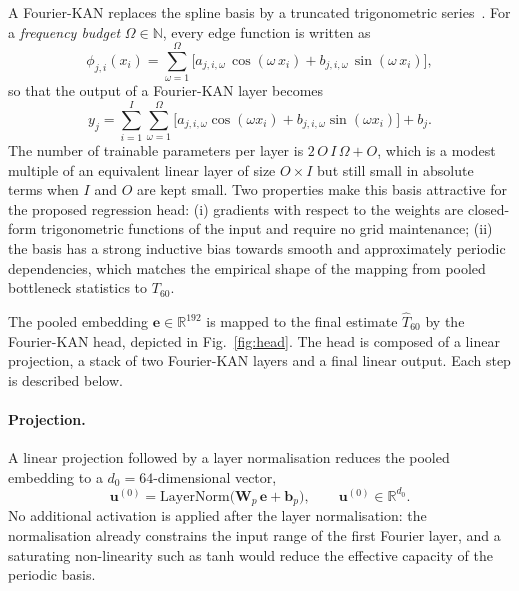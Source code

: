 \documentclass[a4paper,fleqn]{cas-dc}
\begin{document}
A Fourier-KAN replaces the spline basis by a truncated trigonometric
series~\citep{xu2025fourierkan, yang2025kanforspeech}. For a
\emph{frequency budget} $\Omega\in\mathbb{N}$, every edge function is
written as
\begin{equation}\label{eq:fourier_phi}
  \phi_{j,i}(x_i) = \sum_{\omega=1}^{\Omega}
    \bigl[a_{j,i,\omega}\,\cos(\omega\,x_i)
        + b_{j,i,\omega}\,\sin(\omega\,x_i)\bigr],
\end{equation}
so that the output of a Fourier-KAN layer becomes
\begin{equation}\label{eq:fourier_layer}
  y_j = \sum_{i=1}^{I}\sum_{\omega=1}^{\Omega}
        \bigl[a_{j,i,\omega}\cos(\omega x_i)
            + b_{j,i,\omega}\sin(\omega x_i)\bigr] + b_j.
\end{equation}
The number of trainable parameters per layer is $2\,O\,I\,\Omega + O$,
which is a modest multiple of an equivalent linear layer of size
$O\times I$ but still small in absolute terms when $I$ and $O$ are kept
small. Two properties make this basis attractive for the proposed
regression head: (i) gradients with respect to the weights are
closed-form trigonometric functions of the input and require no grid
maintenance; (ii) the basis has a strong inductive bias towards smooth
and approximately periodic dependencies, which matches the empirical
shape of the mapping from pooled bottleneck statistics to $T_{60}$.

The pooled embedding $\mathbf{e}\in\mathbb{R}^{192}$ is mapped to the
final estimate $\hat{T}_{60}$ by the Fourier-KAN head, depicted
in Fig.~\ref{fig:head}. The head is composed of a linear
projection, a stack of two Fourier-KAN layers and a final linear output.
Each step is described below.

\paragraph{Projection.} A linear projection followed by a layer
normalisation reduces the pooled embedding to a $d_{0}=64$-dimensional
vector,
\begin{equation}\label{eq:proj}
  \mathbf{u}^{(0)} = \mathrm{LayerNorm}\bigl(\mathbf{W}_{p}\,\mathbf{e}+
                                              \mathbf{b}_{p}\bigr),
  \qquad \mathbf{u}^{(0)}\in\mathbb{R}^{d_{0}}.
\end{equation}
No additional activation is applied after the layer normalisation:
the normalisation already constrains the input range of the first
Fourier layer, and a saturating non-linearity such as tanh would reduce
the effective capacity of the periodic basis.
\end{document}
